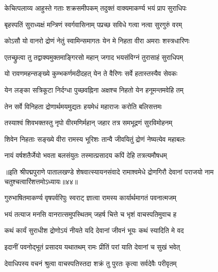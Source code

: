 \twolineshloka
{केचित्पलाय्य आहुस्ते गताः शक्रसमीपकम्}
{तदुक्तं वाक्यमाकर्ण्य भयं प्राप सुराधिपः}%

\twolineshloka
{बृहस्पतिं सुराध्यक्षं मन्त्रिणं स्वर्गवासिनाम्}
{पप्रच्छ सविधे गत्वा नत्वा सुरगुरुं वरम्}%


\twolineshloka
{कोऽसौ यो वानरो द्रोणं नेतुं स्वामिन्समागतः}
{येन मे निहता वीरा अमराः शस्त्रधारिणः}%


\twolineshloka
{एतच्छ्रुत्वा तु तद्वाक्यमुक्तमाङ्गिरसो महान्}
{जगाद भयसंविग्नं तुरासाहं सुराधिपम्}%


\twolineshloka
{यो रावणमहन्सङ्ख्ये कुम्भकर्णमदीदहत्}
{येन ते वैरिणः सर्वे हतास्तस्यैव सेवकः}%

\twolineshloka
{येन लङ्का सत्रिकूटा निर्दग्धा पुच्छवह्निना}
{अक्षश्च निहतो येन हनूमन्तमवेहि तम्}%

\twolineshloka
{तेन सर्वे विनिहता द्रोणार्थमयमुद्यतः}
{हयमेधं महाराजः करोति बलिसत्तमः}%

\twolineshloka
{तस्याश्वं शिवभक्तस्तु नृपो वीरमणिर्महान्}
{जहार तत्र समभूद्रणं सुरविमोहनम्}%

\twolineshloka
{शिवेन निहताः सङ्ख्ये वीरा रामस्य भूरिशः}
{तान्वै जीवयितुं द्रोणं नेष्यत्येव महाबलः}%

\twolineshloka
{नायं वर्षशतैर्जेयो भवता बलसंयुतः}
{तस्मात्प्रसादय कपिं देहि तत्रत्यमौषधम्}%

{॥इति श्रीपद्मपुराणे पातालखण्डे शेषवात्स्यायनसंवादे रामाश्वमेधे द्रोणगिरौ देवानां पराजयो नाम चतुश्चत्वारिंशत्तमोऽध्यायः॥४४॥}



\twolineshloka
{गुरुभाषितमाकर्ण्य वृषपर्वरिपुः स्वराट्}
{ज्ञात्वा रामस्य कार्यार्थमागतं पवनात्मजम्}%

\twolineshloka
{भयं तत्याज मनसि वानरात्समुपस्थितम्}
{जहर्ष चित्ते च भृशं वाचस्पतिमुवाच ह}%


\twolineshloka
{कथं कार्यं सुराधीश द्रोणोऽयं नीयते यदि}
{देवानां जीवनं भूयः कथं स्यादिति मे वद}%

\twolineshloka
{इदानीं पवनोद्भूतं प्रसादय यथातथम्}
{रामः प्रीतिं परां याति देवानां च सुखं भवेत्}%

\twolineshloka
{देवाधिपस्य वचनं श्रुत्वा वाचस्पतिस्तदा}
{शक्रं तु पुरतः कृत्वा सर्वदेवैः परीवृतम्}%

